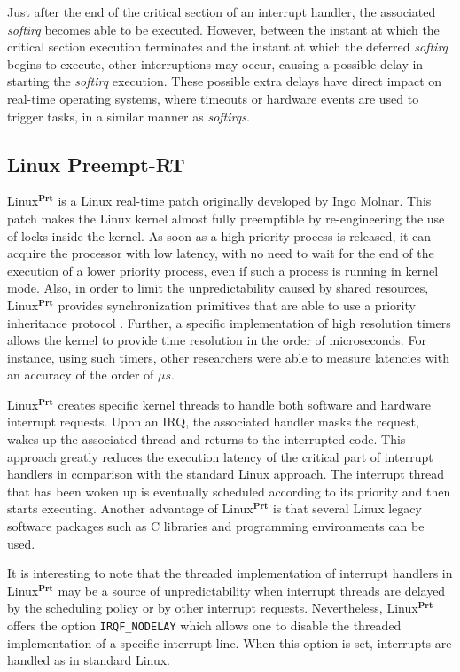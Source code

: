 \documentclass{acm_proc_article-sp}
\newcommand{\cod}[1]{\hspace{0.1cm}\texttt{#1}}
\begin{document}
Just after the end of the critical section of an interrupt handler, the associated
\emph{softirq} becomes able to be executed. However, between the instant at which
the critical section execution terminates and the instant at which the deferred
\emph{softirq} begins to execute, other interruptions may occur, causing a possible
delay in starting the \emph{softirq} execution. These possible extra delays have direct
impact on real-time operating systems, where timeouts or hardware events are used to
trigger tasks, in a similar manner as \emph{softirqs}.


\subsection{Linux Preempt-RT}
\label{sec:preemptRT}

Linux$^{\mathbf{Prt}}$ \cite{McKenney05, Rostedt07} is a Linux real-time patch
originally developed by Ingo Molnar.  This patch makes the Linux kernel almost fully
preemptible by re-engineering the use of locks inside the kernel.  As soon as a high
priority process is released, it can acquire the processor with low latency, with no
need to wait for the end of the execution of a lower priority process, even if such
a process is running in kernel mode. Also, in order to limit the unpredictability
caused by shared resources, Linux$^{\mathbf{Prt}}$ provides synchronization
primitives that are able to use a priority inheritance protocol
\cite{Sha90}. Further, a specific implementation of high resolution timers
  \cite{Kernel} allows the kernel to provide time resolution in the order of
  microseconds. For instance, using such timers, other researchers \cite{Rostedt07,
    Siro07} were able to measure latencies with an accuracy of the order of $\mu
  s$.

Linux$^{\mathbf{Prt}}$ creates specific kernel threads to handle both software and
hardware interrupt requests.  Upon an IRQ, the associated handler masks the request,
wakes up the associated thread and returns to the interrupted code. This
  approach greatly reduces the execution latency of the critical part of interrupt
  handlers in comparison with the standard Linux approach. The interrupt thread
that has been woken up is eventually scheduled according to its priority and then
starts executing.  Another advantage of Linux$^{\mathbf{Prt}}$ is that several Linux
legacy software packages such as C libraries and programming environments can be
used.

\pagebreak
It is interesting to note that the threaded implementation of interrupt handlers in
Linux$^{\mathbf{Prt}}$ may be a source of unpredictability when interrupt threads
are delayed by the scheduling policy or by other interrupt requests. Nevertheless,
Linux$^{\mathbf{Prt}}$ offers the option \cod{IRQF\_NODELAY} which allows one to
disable the threaded implementation of a specific interrupt line. When this option
is set, interrupts are handled as in standard Linux.
\end{document}
